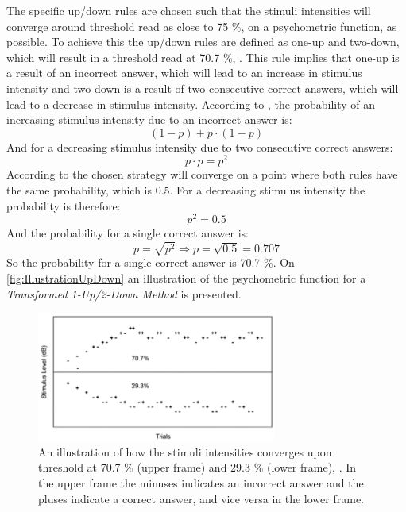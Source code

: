 The specific up/down rules are chosen such that the stimuli intensities will converge around threshold read as close to 75 \%, on a psychometric function, as possible. To achieve this the up/down rules are defined as one-up and two-down, which will result in a threshold read at 70.7 \%, \parencite[p. 22]{PDF:Psychoacoustic}. This rule implies that one-up is a result of an incorrect answer, which will lead to an increase in stimulus intensity and two-down is a result of two consecutive correct answers, which will lead to a decrease in stimulus intensity. According to \textcite[p. 293]{PDF:Hearing}, the probability of an increasing stimulus intensity due to an incorrect answer is: 
%
\begin{equation}
	(1-p)+p\cdot(1-p)
\end{equation}  
%
And for a decreasing stimulus intensity due to two consecutive correct answers: 
%
\begin{equation}
	p\cdot p = p^2
\end{equation}    
%       
According to \textcite[p. 293]{PDF:Hearing} the chosen strategy will converge on a point where both rules have the same probability, which is 0.5. For a decreasing stimulus intensity the probability is therefore:
%
\begin{equation}
	p^2=0.5
\end{equation}  
%
And the probability for a single correct answer is: 
%
\begin{equation}
	p = \sqrt{p^2} \Rightarrow p = \sqrt{0.5} = 0.707
\end{equation}
%
So the probability for a single correct answer is 70.7 \%. On \autoref{fig:IllustrationUpDown} an illustration of the psychometric function for a \textit{Transformed 1-Up/2-Down Method} is presented. 
%
\begin{figure}[H]
	\centering
	\includegraphics[resolution=300,width=0.7\textwidth]{Figure/IllustrationOfUpDown}
	\caption{An illustration of how the stimuli intensities converges upon threshold at 70.7 \% (upper frame) and 29.3 \% (lower frame), \parencite[p. 294]{PDF:Hearing}. In the upper frame the minuses indicates an incorrect answer and the pluses indicate a correct answer, and vice versa in the lower frame.}
	\label{fig:IllustrationUpDown}
\end{figure}
